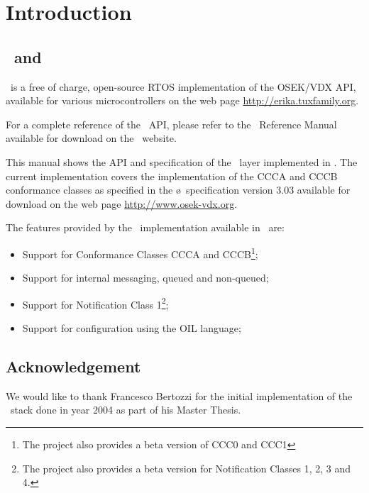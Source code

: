 \chapter{Introduction}

\section{\ee\ and \oc}
\ee\ is a free of charge, open-source RTOS implementation of the
OSEK/VDX API, available for various microcontrollers on the web page
\url{http://erika.tuxfamily.org}.

For a complete reference of the \ee\ API, please refer to the
\ee\ Reference Manual available for download on the \ee\ website.

This manual shows the API and specification of the \oc\ layer
implemented in \ee. The current implementation covers the
implementation of the CCCA and CCCB conformance classes as specified
in the \o\ specification version 3.03 available for download on
the web page \url{http://www.osek-vdx.org}.

The features provided by the \oc\ implementation available in \ee\ are:

\begin{itemize}
\item Support for Conformance Classes CCCA and CCCB\footnote{The project also provides a beta version of CCC0 and CCC1};
\item Support for internal messaging, queued and non-queued;
\item Support for Notification Class 1\footnote{The project also provides a beta version for Notification Classes 1, 2, 3 and 4.};
\item Support for configuration using the OIL language;
\end{itemize}


\section{Acknowledgement}
We would like to thank Francesco Bertozzi for the initial
implementation of the \oc\ stack done in year 2004 as part of his
Master Thesis.

